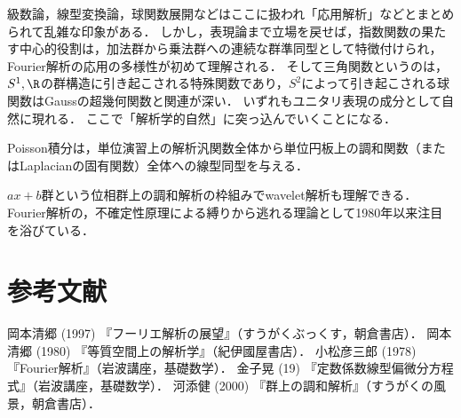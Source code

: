 \documentclass[uplatex,dvipdfmx]{jsreport}
\begin{document}
\begin{history}[表現論的立場]
    級数論，線型変換論，球関数展開などはここに扱われ「応用解析」などとまとめられて乱雑な印象がある．
    しかし，表現論まで立場を戻せば，指数関数の果たす中心的役割は，加法群から乗法群への連続な群準同型として特徴付けられ，
    Fourier解析の応用の多様性が初めて理解される．
    そして三角関数というのは，$S^1,\R$の群構造に引き起こされる特殊関数であり，$S^2$によって引き起こされる球関数はGaussの超幾何関数と関連が深い．
    いずれもユニタリ表現の成分として自然に現れる．
    ここで「解析学的自然」に突っ込んでいくことになる．
\end{history}

\begin{history}[表現論と函数解析が交差するとき]
    Poisson積分は，単位演習上の解析汎関数全体から単位円板上の調和関数（またはLaplacianの固有関数）全体への線型同型を与える\cite{岡本}．
\end{history}

\begin{history}[wavelet]
    $ax+b$群という位相群上の調和解析の枠組みでwavelet解析も理解できる．
    Fourier解析の，不確定性原理による縛りから逃れる理論として1980年以来注目を浴びている．
\end{history}

\chapter{参考文献}

\begin{thebibliography}{99}
    岡本清郷 (1997) 『フーリエ解析の展望』（すうがくぶっくす，朝倉書店）．
    岡本清郷 (1980) 『等質空間上の解析学』（紀伊國屋書店）．
    小松彦三郎 (1978) 『Fourier解析』（岩波講座，基礎数学）．
    金子晃 (19) 『定数係数線型偏微分方程式』（岩波講座，基礎数学）．
    河添健 (2000) 『群上の調和解析』（すうがくの風景，朝倉書店）．
\end{thebibliography}
\end{document}
